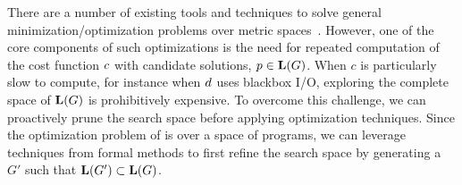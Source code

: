 There are a number of existing tools and techniques to solve general minimization/optimization problems over metric spaces~\cite{optmizationTextbook}.
However, one of the core components of such optimizations is the need for repeated computation of the cost function ${c}$ with candidate solutions, $p \in \mathbf{L}(G)$.
When $c$ is particularly slow to compute, for instance when ${d}$ uses blackbox I/O, exploring the complete space of $\mathbf{L}(G)$ is prohibitively expensive.
To overcome this challenge, we can proactively prune the search space before applying optimization techniques.
Since the optimization problem of \approximatePBE is over a space of programs, we can leverage techniques from formal methods to first refine the search space by generating a $G'$ such that $\mathbf{L}(G') \subset \mathbf{L}(G)$.
